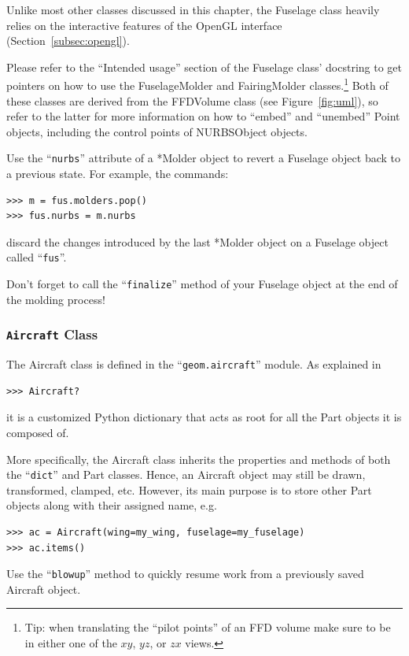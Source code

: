 \documentclass[]{article}
\begin{document}
Unlike most other classes discussed in this chapter, the Fuselage class 
heavily relies on the interactive features of the OpenGL interface 
(Section~\ref{subsec:opengl}).

Please refer to the ``Intended usage'' section of the Fuselage class' 
docstring to get pointers on how to use the FuselageMolder and 
FairingMolder classes.\footnote{Tip: when translating the ``pilot 
points'' of an FFD volume make sure to be in either one of the $xy$, 
$yz$, or $zx$ views.}  Both of these classes are derived from the 
FFDVolume class (see Figure~\ref{fig:uml}), so refer to the latter for 
more information on how to ``embed'' and ``unembed'' Point objects, 
including the control points of NURBSObject objects.

Use the ``\texttt{nurbs}'' attribute of a *Molder object to revert a 
Fuselage object back to a previous state.  For example, the commands:
\begin{verbatim}
>>> m = fus.molders.pop()
>>> fus.nurbs = m.nurbs
\end{verbatim}
discard the changes introduced by the last *Molder object on a Fuselage 
object called ``\texttt{fus}''.

Don't forget to call the ``\texttt{finalize}'' method of your Fuselage 
object at the end of the molding process!

\subsubsection{\texttt{Aircraft} Class}
\label{subsubsec:aircraft}

The Aircraft class is defined in the ``\texttt{geom.aircraft}'' module.  
As explained in
\begin{verbatim}
>>> Aircraft?
\end{verbatim}
it is a customized Python dictionary that acts as root for all the Part 
objects it is composed of.

More specifically, the Aircraft class inherits the properties and 
methods of both the ``\texttt{dict}'' and Part classes.  Hence, an 
Aircraft object may still be drawn, transformed, clamped, etc.  However, 
its main purpose is to store other Part objects along with their 
assigned name, e.g.
\begin{verbatim}
>>> ac = Aircraft(wing=my_wing, fuselage=my_fuselage)
>>> ac.items()
\end{verbatim}

Use the ``\texttt{blowup}'' method to quickly resume work from a 
previously saved Aircraft object.
\end{document}
